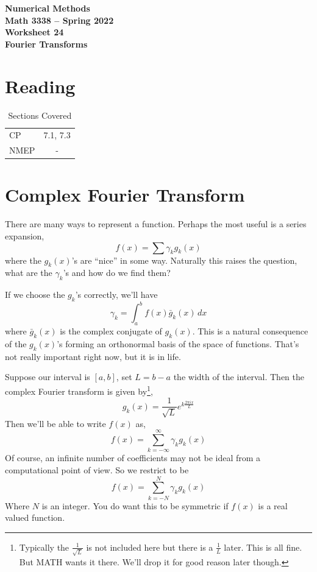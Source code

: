 \documentclass[11pt,letterpaper]{article}
\newcommand{\semester}{Spring 2022}
\begin{document}
\begin{center}
{\huge{\bf  Numerical Methods}} \\[1.5ex]
{\bf Math 3338 -- \semester}\\[1.5ex]
{\Large{\bf Worksheet 24\ \\[2ex] Fourier Transforms}}\\
\end{center}
\vspace{2mm}


\section{Reading}

\begin{table}[!ht]
 \centering
 \begin{tabular}{lc}
   CP &  7.1, 7.3 \\
 NMEP &  -
 \end{tabular}
\caption{Sections Covered}
\end{table}

\section{Complex Fourier Transform}
There are many ways to represent a function. Perhaps the most useful is a series expansion,
\[
 f(x) = \sum \gamma_k g_k(x)
\]
where the $g_k(x)$'s are ``nice'' in some way. Naturally this raises the question, what are the
$\gamma_k$'s and how do we find them?

If we choose the $g_k$'s correctly, we'll have 
\[
 \gamma_k = \int_a^b f(x) \bar{g}_k(x)\,dx
\]
where $\bar{g}_k(x)$ is the complex conjugate of $g_k(x)$. This is a natural consequence of the
$g_k(x)$'s forming an orthonormal basis of the space of functions. That's not really important right
now, but it is in life.

Suppose our interval is $[a,b]$, set $L=b-a$ the width of the interval. Then the complex
Fourier transform is given by\footnote{Typically the $\frac{1}{\sqrt{L}}$ is not included here but
there is a $\frac{1}{L}$ later. This is all fine. But MATH wants it there. We'll drop it for 
good reason later though.},
\[
 g_k(x) = \frac{1}{\sqrt{L}} e^{k\frac{2\pi ix}{L}}
\]
Then we'll be able to write $f(x)$ as,
\[
 f(x) = \sum_{k=-\infty}^\infty \gamma_k g_k(x)
\]
Of course, an infinite number of coefficients may not be ideal from a computational point of view.
So we restrict to be
\[
 f(x) = \sum_{k=-N}^N \gamma_k g_k(x)
\]
Where $N$ is an integer. You do want this to be symmetric if $f(x)$ is a real valued function.
\end{document}

